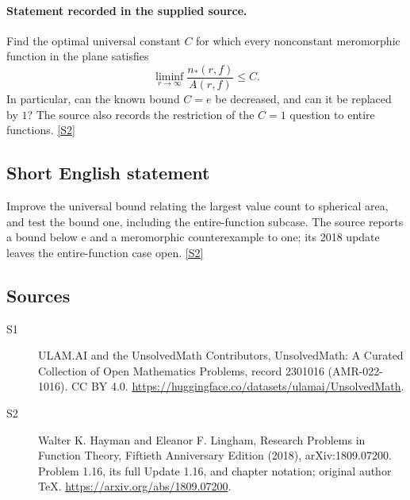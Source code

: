 \documentclass[11pt]{article}
\newcommand{\sref}[2]{\hyperlink{source:#1:#2}{[S#2]}}
\begin{document}
\paragraph{Statement recorded in the supplied source.}
Find the optimal universal constant $C$ for which every nonconstant meromorphic function in the plane satisfies
\[
 \liminf_{r\to\infty}\frac{n_*(r,f)}{A(r,f)}\le C.
\]
In particular, can the known bound $C=e$ be decreased, and can it be replaced by $1$? The source also records the restriction of the $C=1$ question to entire functions. \sref{2301016}{2}
\subsection{Short English statement}
Improve the universal bound relating the largest value count to spherical area, and test the bound one, including the entire-function subcase. The source reports a bound below e and a meromorphic counterexample to one; its 2018 update leaves the entire-function case open. \sref{2301016}{2}
\subsection{Sources}
\begin{description}
\item[\hypertarget{source:2301016:1}{S1}] ULAM.AI and the UnsolvedMath Contributors, UnsolvedMath: A Curated Collection of Open Mathematics Problems, record 2301016 (AMR-022-1016). CC BY 4.0. \url{https://huggingface.co/datasets/ulamai/UnsolvedMath}.
\item[\hypertarget{source:2301016:2}{S2}] Walter K. Hayman and Eleanor F. Lingham, Research Problems in Function Theory, Fiftieth Anniversary Edition (2018), arXiv:1809.07200. Problem 1.16, its full Update 1.16, and chapter notation; original author TeX. \url{https://arxiv.org/abs/1809.07200}.
\end{description}
\label{end:2301016}
\end{document}
